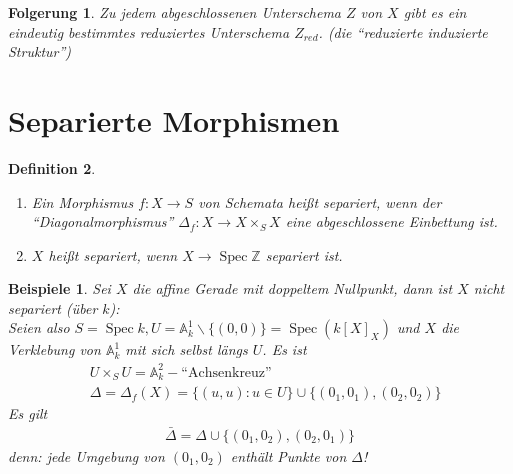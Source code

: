 \documentclass[a4paper,oneside]{scrbook}
\theoremstyle{break}
\newtheorem{Def}{Definition}[section]
\newtheorem{Folg}[Def]{Folgerung}
\theoremstyle{nonumberbreak}
\newtheorem{nnBsp}{Beispiele}
\theoremstyle{nonumberplain}
\theoremstyle{break}
\newcommand{\Spec}{%
	\ensuremath{\operatorname{Spec}}%
}
\DeclareMathOperator{\id}{id}
\begin{document}
\begin{Folg}
  \label{folg:6.5}
  Zu jedem abgeschlossenen Unterschema $Z$ von $X$ gibt es ein eindeutig bestimmtes reduziertes Unterschema $Z_{red}$. 
  (die ``reduzierte induzierte Struktur'')
\end{Folg}

\section{Separierte Morphismen}
\begin{Def}
  \label{def:7.1}
  \begin{enumerate}
  \item Ein Morphismus $f:X\to S$ von Schemata heißt \emph{separiert},  wenn der ``Diagonalmorphismus'' $\Delta_f:X\to X\times_S X$ 
    eine abgeschlossene Einbettung ist.
    \begin{center}
    \end{center}
  \item $X$ heißt \emph{separiert}, wenn $X\to \Spec \mathbb Z$ separiert ist.
  \end{enumerate}
\end{Def}

\begin{nnBsp}
  Sei $X$ die affine Gerade mit doppeltem Nullpunkt, dann ist $X$ nicht separiert (über $k$): \\
  Seien also $S=\Spec k, U=\mathbb A_k^1\backslash\{(0,0)\}=\Spec(k[X]_X)$ und $X$ die Verklebung von $\mathbb A_k^1$ mit sich selbst längs $U$. 
  Es ist
  \begin{align*}
    & U\times_S U=\mathbb A_k^2-\text{``Achsenkreuz''} \\
    & \Delta=\Delta_f(X)=\{(u,u):u\in U\}\cup\{(0_1,0_1),(0_2,0_2)\}
  \end{align*}
  Es gilt
  \begin{align*}
    \bar{\Delta}=\Delta\cup\{(0_1,0_2),(0_2,0_1)\}
  \end{align*}
  denn: jede Umgebung von $(0_1,0_2)$ enthält Punkte von $\Delta$!
\end{nnBsp}
\end{document}
